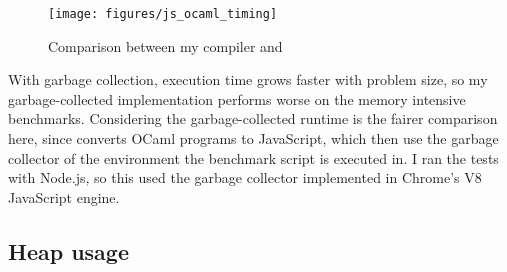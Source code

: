 



\begin{figure}[H]
\hspace{-1.6cm}
\texttt{[image: figures/js\_ocaml\_timing]}
\vspace{-0.5cm}
\caption{Comparison between my compiler and \jsofocaml{}}
 \label{fig:js_oc_timing} 
\end{figure}

With garbage collection, execution time grows faster with problem size, so my garbage-collected implementation performs worse on the memory intensive benchmarks. Considering the garbage-collected runtime is the fairer comparison here, since \jsofocaml{} converts OCaml programs to JavaScript, which then use the garbage collector of the environment the benchmark script is executed in. I ran the tests with Node.js, so this used the garbage collector implemented in Chrome's V8 JavaScript engine. 




\subsection{Heap usage}

